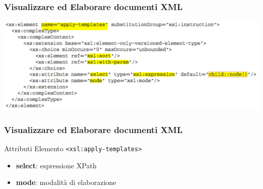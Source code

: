 \begin{frame}
    \frametitle{Visualizzare ed Elaborare documenti XML}
    \addtocounter{nframe}{1}
    
    \begin{center}
        \includegraphics[width=.9\textwidth]{imgs/Schema-apply-templates.png}
    \end{center}

\end{frame}

\begin{frame}
    \frametitle{Visualizzare ed Elaborare documenti XML}
    \addtocounter{nframe}{1}
    

     \begin{block}{Attributi Elemento \texttt{<xsl:apply-templates>}}
         \begin{itemize}
             \item \textbf{select}: espressione XPath
             \item \textbf{mode}: modalità di elaborazione
        \end{itemize}
     \end{block}
    
\end{frame}

